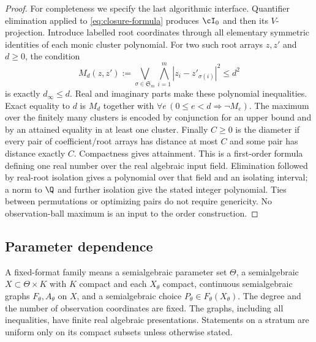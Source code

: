 \begin{proof}
For completeness we specify the last algorithmic interface. Quantifier
elimination applied to \eqref{eq:closure-formula} produces $\cI_0$ and
then its $V$-projection. Introduce labelled root coordinates through all
elementary symmetric identities of each monic cluster polynomial.
For two such root arrays $z,z'$ and $d\ge0$, the condition
\begin{equation}\label{eq:matching-formula}
 M_d(z,z'):=\bigvee_{\sigma\in\mathfrak S_m}
          \bigwedge_{i=1}^m |z_i-z'_{\sigma(i)}|^2\le d^2
\end{equation}
is exactly $d_\infty\le d$. Real and imaginary parts make these
polynomial inequalities. Exact equality to $d$ is $M_d$ together with
$\forall e\,(0\le e<d\Rightarrow\neg M_e)$. The maximum over the
finitely many clusters is encoded by conjunction for an upper bound
and by an attained equality in at least one cluster. Finally $C\ge0$
is the diameter if every pair of coefficient/root arrays has distance
at most $C$ and some pair has distance exactly $C$. Compactness gives
attainment. This is a first-order formula defining one real number over
the real algebraic input field. Elimination followed by real-root
isolation gives a polynomial over that field and an isolating interval;
a norm to $\Q$ and further isolation give the stated integer polynomial.
Ties between permutations or optimizing pairs do not require genericity.
No observation-ball maximum is an input to the order construction.
\end{proof}

\subsection{Parameter dependence}
A fixed-format family means a semialgebraic parameter set $\Theta$, a
semialgebraic $X\subset\Theta\times K$ with $K$ compact and each $X_\theta$
compact, continuous semialgebraic graphs $F_\theta,A_\theta$ on $X$, and a
semialgebraic choice $P_\theta\in F_\theta(X_\theta)$. The degree and the
number of observation coordinates are fixed. The graphs, including all
inequalities, have finite real algebraic presentations. Statements on a
stratum are uniform only on its compact subsets unless otherwise stated.

